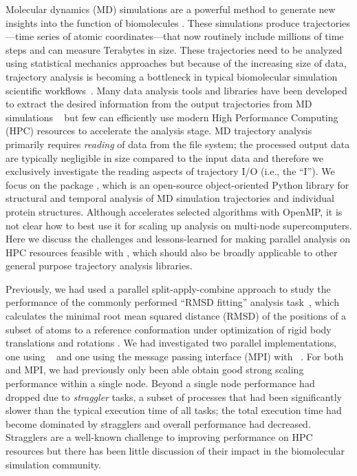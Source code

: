 \label{sec:introduction}
Molecular dynamics (MD) simulations are a powerful method to generate new insights into the function of biomolecules \citep{Borhani:2012mi, Dror:2012cr, Orozco:2014dq, Perilla:2015kx, Bottaro:2018aa}.
These simulations produce trajectories---time series of atomic coordinates---that now routinely include millions of time steps and can measure Terabytes in size.
These trajectories need to be analyzed using statistical mechanics approaches \cite{Tuckerman:2010cr, Mura:2014kx} but because of the increasing size of data, trajectory analysis is becoming a bottleneck in typical biomolecular simulation scientific workflows~\cite{Cheatham:2015}.
Many data analysis tools and libraries have been developed to extract the desired information from the output trajectories from MD simulations ~\cite{nmoldyn, nmoldyn-2012, Hum96, Hinsen:2000kx, Grant:2006ud, himach-2008, Romo:2009zr, Romo:2014bh, Michaud-Agrawal:2011fu, Gowers:2016aa, cpptraj-2013, McGibbon:2015aa, pteros2015, Doerr:2016aa} but few can efficiently use modern High Performance Computing (HPC) resources to accelerate the analysis stage.
MD trajectory analysis primarily requires \emph{reading} of data from the file system; the processed output data are typically negligible in size compared to the input data and therefore we exclusively investigate the reading aspects of trajectory I/O (i.e., the ``I'').
We focus on the  package \cite{Gowers:2016aa,Michaud-Agrawal:2011fu}, which is an open-source object-oriented Python library for structural and temporal analysis of MD simulation trajectories and individual protein structures.
Although  accelerates selected algorithms with OpenMP, it is not clear how to best use it for scaling up analysis on multi-node supercomputers.
Here we discuss the challenges and lessons-learned for making parallel analysis on HPC resources feasible with , which should also be broadly applicable to other general purpose trajectory analysis libraries.

Previously, we had used a parallel split-apply-combine  approach to study the performance of the commonly performed ``RMSD fitting'' analysis task~\cite{Khoshlessan:2017ab, ICCP-2018}, which calculates the minimal root mean squared distance (RMSD) of the positions of a subset of atoms to a reference conformation under optimization of rigid body translations and rotations \cite{Liu:2010kx, Lea96, Mura:2014kx}.
We had investigated two parallel implementations, one using ~\cite{Rocklin:2015aa} and one using the message passing interface (MPI) with ~\cite{Dalcin:2011aa, Dalcin:2005aa}. 
For both  and MPI, we had previously only been able obtain good strong scaling performance within a single node.
Beyond a single node performance had dropped due to \emph{straggler} tasks, a subset of processes that had been significantly slower than the typical execution time of all tasks; the total execution time had become dominated by stragglers and overall performance had decreased.
Stragglers are a well-known challenge to improving performance on HPC resources \cite{Garraghan2016} but there has been little discussion of their impact in the biomolecular simulation community.

